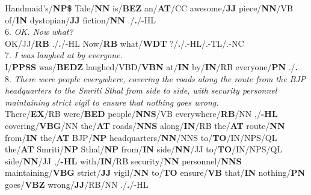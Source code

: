 \documentclass[11pt,a4paper,twocolumn]{article}
\begin{document}
	Handmaid’s/\textcolor{hlit}{\textbf{NP\$} }
	Tale/\textcolor{hlit}{\textbf{NN} }
	is/\textcolor{hlit}{\textbf{BEZ} }
	an/\textcolor{hlit}{\textbf{AT}/CC }
	awesome/\textcolor{hlit}{\textbf{JJ} }
	piece/\textcolor{hlit}{\textbf{NN}/VB }
	of/\textcolor{hlit}{\textbf{IN} }
	dystopian/\textcolor{hlit}{\textbf{JJ}} 
	fiction/\textcolor{hlit}{\textbf{NN}} 
	./\textcolor{hlit}{\textbf{.}/-HL\\}
	$ $\\%
	6. \textit{OK. Now what?}\\
	OK/\textcolor{hlit}{JJ/\textbf{RB} }
	./\textcolor{hlit}{\textbf{.}/-HL }
	Now/\textcolor{hlit}{\textbf{RB} }
	what/\textcolor{hlit}{\textbf{WDT} }
	?/\textcolor{hlit}{\textbf{.}/.-HL/.-TL/.-NC}\\
	$ $\\%
	7. \textit{I was laughed at by everyone.}\\
	I/\textcolor{hlit}{\textbf{PPSS} }
	was/\textcolor{hlit}{\textbf{BEDZ} }
	laughed/\textcolor{hlit}{VBD/\textbf{VBN}} 
	at/\textcolor{hlit}{\textbf{IN} }
	by/\textcolor{hlit}{\textbf{IN}/RB }
	everyone/\textcolor{hlit}{\textbf{PN} }
	./\textcolor{hlit}{\textbf{.}}\\
	$ $\\%
	8. \textit{There were people everywhere, covering the roads along 
	the route from the BJP headquarters to the Smriti Sthal 
	from side to side, with security personnel maintaining 
	strict vigil to ensure that nothing goes wrong.}\\
	There/\textcolor{hlit}{\textbf{EX}/RB }
	were/\textcolor{hlit}{\textbf{BED} }
	people/\textcolor{hlit}{\textbf{NNS}/VB} 
	everywhere/\textcolor{hlit}{\textbf{RB}/NN}
	,/\textcolor{hlit}{\textbf{-HL} }
	covering/\textcolor{hlit}{\textbf{VBG}/NN} 
	the/\textcolor{hlit}{\textbf{AT} }
	roads/\textcolor{hlit}{\textbf{NNS}} 
	along/\textcolor{hlit}{\textbf{IN}/RB} 
	the/\textcolor{hlit}{\textbf{AT} }
	route/\textcolor{hlit}{\textbf{NN}} 
	from/\textcolor{hlit}{\textbf{IN} }
	the/\textcolor{hlit}{\textbf{AT} }
	BJP/\textcolor{hlit}{\textbf{NP} }
	headquarters/\textcolor{hlit}{\textbf{NN}/NNS }
	to/\textcolor{hlit}{\textbf{TO}/IN/NPS/QL }
	the/\textcolor{hlit}{\textbf{AT} }
	Smriti/\textcolor{hlit}{\textbf{NP}} 
	Sthal/\textcolor{hlit}{\textbf{NP} }
	from/\textcolor{hlit}{\textbf{IN} }
	side/\textcolor{hlit}{\textbf{NN}/JJ} 
	to/\textcolor{hlit}{\textbf{TO}/IN/NPS/QL} 
	side/\textcolor{hlit}{\textbf{NN}/JJ}
	,/\textcolor{hlit}{\textbf{-HL} }
	with/\textcolor{hlit}{\textbf{IN}/RB} 
	security/\textcolor{hlit}{\textbf{NN}} 
	personnel/\textcolor{hlit}{\textbf{NNS}} 
	maintaining/\textcolor{hlit}{\textbf{VBG}} 
	strict/\textcolor{hlit}{\textbf{JJ} }
	vigil/\textcolor{hlit}{\textbf{NN} }
	to/\textcolor{hlit}{\textbf{TO} }
	ensure/\textcolor{hlit}{\textbf{VB}} 
	that/\textcolor{hlit}{\textbf{IN} }
	nothing/\textcolor{hlit}{\textbf{PN}} 
	goes/\textcolor{hlit}{\textbf{VBZ} }
	wrong/\textcolor{hlit}{\textbf{JJ}/RB/NN}
	./\textcolor{hlit}{\textbf{.}/-HL}\\
	
\end{document}
